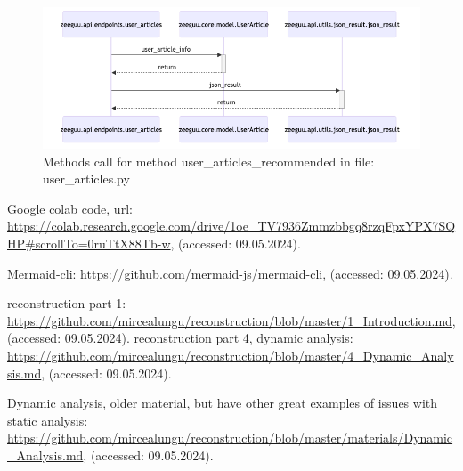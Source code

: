 \documentclass[12pt,a4paper]{report}
\begin{document}
    \begin{figure}[H]
        \centering
        \includegraphics[scale=0.45]{user_articles_recommended.png}
        \caption{Methods call for method user\_articles\_recommended in file: user\_articles.py}
        \label{user_articles_recommended}
    \end{figure}
   





    \begin{thebibliography}{9}
        
        Google colab code, url: \url{https://colab.research.google.com/drive/1oe_TV7936Zmmzbbgq8rzqFpxYPX7SQHP#scrollTo=0ruTtX88Tb-w}, (accessed: 09.05.2024).
        
        Mermaid-cli: \url{https://github.com/mermaid-js/mermaid-cli}, (accessed: 09.05.2024).
       
        reconstruction part 1: \url{https://github.com/mircealungu/reconstruction/blob/master/1_Introduction.md}, (accessed: 09.05.2024).
        reconstruction part 4, dynamic analysis: \url{https://github.com/mircealungu/reconstruction/blob/master/4_Dynamic_Analysis.md}, (accessed: 09.05.2024).
       
        Dynamic analysis, older material, but have other great examples of issues with static analysis: \url{https://github.com/mircealungu/reconstruction/blob/master/materials/Dynamic_Analysis.md}, (accessed: 09.05.2024).
       
    
    \end{thebibliography}
    

   
    
  
\end{document}
